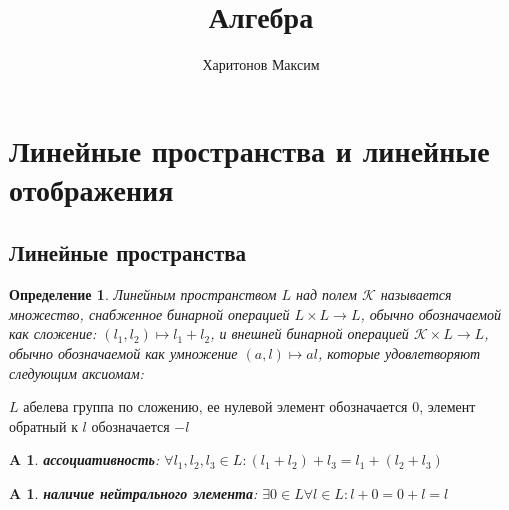 \documentclass[11pt]{article} %
\title{Алгебра}
\author{Харитонов Максим}
\begin{document}
\maketitle

\section{Линейные пространства и линейные отображения}


\subsection{Линейные пространства}

\newtheorem{def1}{Определение}
\begin{def1}
Линейным пространством $L$ над полем $\mathscr{K}$ называется множество, снабженное бинарной операцией $L \times L \rightarrow L$, обычно обозначаемой как сложение: $(l_1, l_2) \mapsto l_1 + l_2$, и внешней бинарной операцией $\mathscr{K} \times L \rightarrow L$, обычно обозначаемой как умножение $(a,l) \mapsto al$, которые удовлетворяют следующим аксиомам:
\end{def1}
$L$ абелева группа по сложению, ее нулевой элемент обозначается 0, элемент обратный к $l$ обозначается $-l$

\newtheorem{a1}{A}
\begin{a1}
\textbf{ассоциативность}: $\forall l_1, l_2, l_3 \in L: (l_1 + l_2) + l_3 = l_1 + (l_2 + l_3)$
\end{a1}

\newtheorem{a2}{A}
\begin{a2}
\textbf{наличие нейтрального элемента}: $\exists 0 \in L \forall l \in L: l + 0 = 0 + l = l$
\end{a2}
\end{document}
